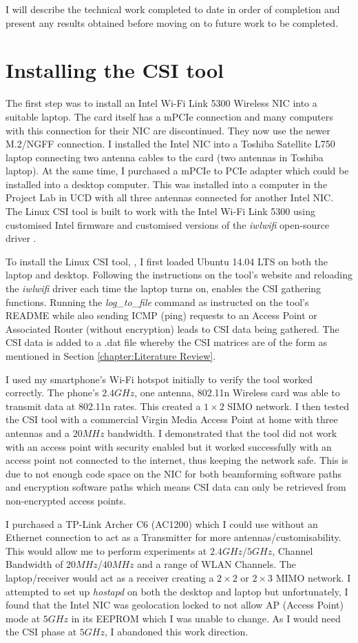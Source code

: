 I will describe the technical work completed to date in order of completion and present any results obtained before moving on to future work to be completed. 
\section{Installing the CSI tool}
The first step was to install an Intel Wi-Fi Link 5300 Wireless NIC into a suitable laptop. The card itself has a mPCIe connection and many computers with this connection for their NIC are discontinued. They now use the newer M.2/NGFF connection. I installed the Intel NIC into a Toshiba Satellite L750 laptop connecting two antenna cables to the card (two antennas in Toshiba laptop). At the same time, I purchased a mPCIe to PCIe adapter which could be installed into a desktop computer. This was installed into a computer in the Project Lab in UCD with all three antennas connected for another Intel NIC. The Linux CSI tool is built to work with the Intel Wi-Fi Link 5300 using customised Intel firmware and customised versions of the \textit{iwlwifi} open-source driver \citep{Halperin_csitool}. \par
To install the Linux CSI tool, \cite{Halperin_csitool}, I first loaded Ubuntu 14.04 LTS on both the laptop and desktop. 
Following the instructions on the tool's website and reloading the \textit{iwlwifi} driver each time the laptop turns on, enables the CSI gathering functions. Running the \textit{log\_to\_file} command as instructed on the tool's README while also sending ICMP (ping) requests to an Access Point or Associated Router (without encryption) leads to CSI data being gathered. The CSI data is added to a .dat file whereby the CSI matrices are of the form as mentioned in Section \ref{chapter:Literature Review}. \par
I used my smartphone's Wi-Fi hotspot initially to verify the tool worked correctly. The phone's $2.4GHz$, one antenna, 802.11n Wireless card was able to transmit data at 802.11n rates. This created a $1\times 2$ SIMO network. I then tested the CSI tool with a commercial Virgin Media Access Point at home with three antennas and a $20MHz$ bandwidth. I demonstrated that the tool did not work with an access point with security enabled but it worked successfully with an access point not connected to the internet, thus keeping the network safe. This is due to not enough code space on the NIC for both beamforming software paths and encryption software paths which means CSI data can only be retrieved from non-encrypted access points.  \par 
I purchased a TP-Link Archer C6 (AC1200) which I could use without an Ethernet connection to act as a Transmitter for more antennas/customisability. This would allow me to perform experiments at $2.4GHz$/$5GHz$, Channel Bandwidth of $20MHz$/$40MHz$ and a range of WLAN Channels. The laptop/receiver would act as a receiver creating a $2\times 2$ or $2\times 3$ MIMO network. I attempted to set up \textit{hostapd} on both the desktop and laptop but unfortunately, I found that the Intel NIC was geolocation locked to not allow AP (Access Point) mode at $5GHz$ in its EEPROM which I was unable to change. As I would need the CSI phase at $5GHz$, I abandoned this work direction. 
